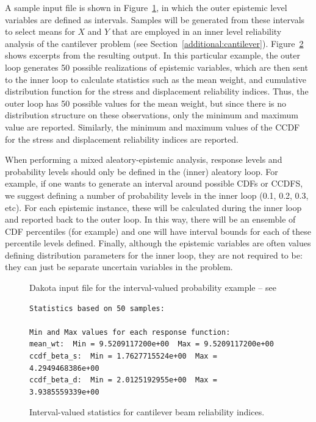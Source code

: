 A sample input file is shown in Figure~\ref{adv_models:2ndprob}, in
which the outer epistemic level variables are defined as
intervals. Samples will be generated from these intervals to select
means for $X$ and $Y$ that are employed in an inner level reliability
analysis of the cantilever problem (see
Section~\ref{additional:cantilever}).
Figure~\ref{adv_models:2ndprob_res} shows excerpts from the resulting
output. In this particular example, the outer loop generates 50
possible realizations of epistemic variables, which are then sent to
the inner loop to calculate statistics such as the mean weight, and
cumulative distribution function for the stress and displacement
reliability indices. Thus, the outer loop has 50 possible values for
the mean weight, but since there is no distribution structure on these
observations, only the minimum and maximum value are reported.
Similarly, the minimum and maximum values of the CCDF for the stress
and displacement reliability indices are reported.

When performing a mixed aleatory-epistemic analysis, response levels and 
probability levels should only be defined in the (inner) aleatory loop. 
For example, if one wants to generate an interval around possible 
CDFs or CCDFS, we suggest defining a number of probability levels 
in the inner loop (0.1, 0.2, 0.3, etc). For each epistemic instance, 
these will be calculated during the inner loop and reported back to the 
outer loop. In this way, there will be an ensemble of CDF percentiles 
(for example) and one will have interval bounds for each of these 
percentile levels defined. Finally, although the epistemic variables are 
often values defining distribution parameters for the inner loop, 
they are not required to be: they can just be separate uncertain variables 
in the problem. 
\begin{figure}
  \centering
  \begin{bigbox}
    \begin{tiny}
    \end{tiny}
  \end{bigbox}
  \caption{Dakota input file for the interval-valued probability example --
see \protect{} }
  \label{adv_models:2ndprob}
\end{figure}

\begin{figure}
\centering
\begin{bigbox}
\begin{small}
\begin{verbatim}
Statistics based on 50 samples:

Min and Max values for each response function:
mean_wt:  Min = 9.5209117200e+00  Max = 9.5209117200e+00
ccdf_beta_s:  Min = 1.7627715524e+00  Max = 4.2949468386e+00
ccdf_beta_d:  Min = 2.0125192955e+00  Max = 3.9385559339e+00
\end{verbatim}
\end{small}
\end{bigbox}
\caption{Interval-valued statistics for cantilever beam reliability indices.}
\label{adv_models:2ndprob_res}
\end{figure}

